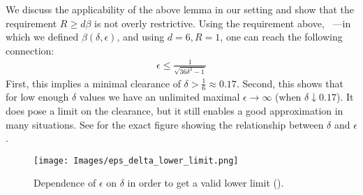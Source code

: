 

We discuss the applicability of the above lemma in our setting and show that the requirement $R\geq d\beta$ is not overly restrictive.  Using the requirement above, ~---in which we defined $\beta(\delta,\epsilon)$, and using $d=6,R=1$, one can reach the following connection:
\begin{align*}
    \epsilon \leq \frac{1}{\sqrt{36\delta^2-1}}
\end{align*}
First, this implies a minimal clearance of ${\delta>\frac{1}{6}\approx0.17}$. Second, this shows that for low enough $\delta$ values we have an unlimited maximal $\epsilon\rightarrow\infty$ (when $\delta\downarrow0.17$). It does pose a limit on the clearance, but it still enables a good approximation in many situations. See  for the exact figure showing the relationship between $\delta$ and $\epsilon$.  
\begin{figure}[thb]
\centering  
\texttt{[image: Images/eps\_delta\_lower\_limit.png]}
\caption{Dependence of $\epsilon$ on $\delta$ in order to get a valid lower limit ().}
\label{:limit_graph_lower}
\end{figure}


